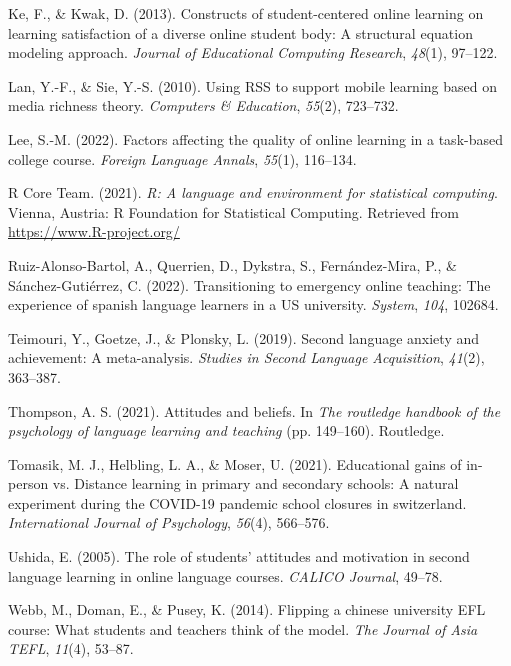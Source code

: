 \documentclass[
  man]{apa6}
\newlength{\cslhangindent}
\newlength{\cslentryspacingunit} %
\newenvironment{CSLReferences}[2] %
 {%
  \setlength{\parindent}{0pt}
  \ifodd #1
  \let\oldpar\par
  \def\par{\hangindent=\cslhangindent\oldpar}
  \fi
  \setlength{\parskip}{#2\cslentryspacingunit}
 }%
 {}
\begin{document}
\begin{CSLReferences}{1}{0}
\leavevmode{}%
Ke, F., \& Kwak, D. (2013). Constructs of student-centered online learning on learning satisfaction of a diverse online student body: A structural equation modeling approach. \emph{Journal of Educational Computing Research}, \emph{48}(1), 97--122.

\leavevmode{}%
Lan, Y.-F., \& Sie, Y.-S. (2010). Using RSS to support mobile learning based on media richness theory. \emph{Computers \& Education}, \emph{55}(2), 723--732.

\leavevmode{}%
Lee, S.-M. (2022). Factors affecting the quality of online learning in a task-based college course. \emph{Foreign Language Annals}, \emph{55}(1), 116--134.

\leavevmode{}%
R Core Team. (2021). \emph{R: A language and environment for statistical computing}. Vienna, Austria: R Foundation for Statistical Computing. Retrieved from \url{https://www.R-project.org/}

\leavevmode{}%
Ruiz-Alonso-Bartol, A., Querrien, D., Dykstra, S., Fernández-Mira, P., \& Sánchez-Gutiérrez, C. (2022). Transitioning to emergency online teaching: The experience of spanish language learners in a US university. \emph{System}, \emph{104}, 102684.

\leavevmode{}%
Teimouri, Y., Goetze, J., \& Plonsky, L. (2019). Second language anxiety and achievement: A meta-analysis. \emph{Studies in Second Language Acquisition}, \emph{41}(2), 363--387.

\leavevmode{}%
Thompson, A. S. (2021). Attitudes and beliefs. In \emph{The routledge handbook of the psychology of language learning and teaching} (pp. 149--160). Routledge.

\leavevmode{}%
Tomasik, M. J., Helbling, L. A., \& Moser, U. (2021). Educational gains of in-person vs. Distance learning in primary and secondary schools: A natural experiment during the COVID-19 pandemic school closures in switzerland. \emph{International Journal of Psychology}, \emph{56}(4), 566--576.

\leavevmode{}%
Ushida, E. (2005). The role of students' attitudes and motivation in second language learning in online language courses. \emph{CALICO Journal}, 49--78.

\leavevmode{}%
Webb, M., Doman, E., \& Pusey, K. (2014). Flipping a chinese university EFL course: What students and teachers think of the model. \emph{The Journal of Asia TEFL}, \emph{11}(4), 53--87.

\end{CSLReferences}
\end{document}
